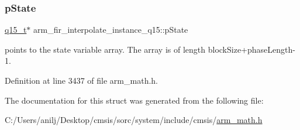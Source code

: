 \mbox{\label{structarm__fir__interpolate__instance__q15_a26b864363fa47954248f2590e3a82a3c}} 
\subsubsection{\texorpdfstring{p\+State}{pState}}
{\footnotesize\ttfamily \hyperlink{arm__math_8h_ab5a8fb21a5b3b983d5f54f31614052ea}{q15\+\_\+t}$\ast$ arm\+\_\+fir\+\_\+interpolate\+\_\+instance\+\_\+q15\+::p\+State}

points to the state variable array. The array is of length block\+Size+phase\+Length-\/1. 

Definition at line 3437 of file arm\+\_\+math.\+h.



The documentation for this struct was generated from the following file\+:\begin{DoxyCompactItemize}
\item 
C\+:/\+Users/anilj/\+Desktop/cmsis/sorc/system/include/cmsis/\hyperlink{arm__math_8h}{arm\+\_\+math.\+h}\end{DoxyCompactItemize}
